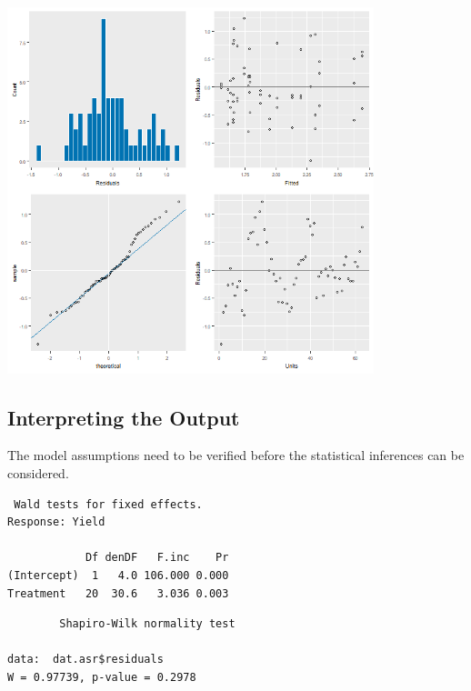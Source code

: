 \documentclass[a4paper, 10pt, fleqn, twosided]{memoir}
\begin{document}
\begin{tcolorbox}[title = Example 6 Output]
\includegraphics[width=0.8\textwidth, frame]{Example6Resplot.png}
\end{tcolorbox}


\subsection{Interpreting the Output}

The model assumptions need to be verified before the statistical inferences can be considered.

\begin{tcolorbox}[title = Example 6 Shapiro-Wilk normality test output]
\begin{verbatim}
 Wald tests for fixed effects.
Response: Yield

            Df denDF   F.inc    Pr
(Intercept)  1   4.0 106.000 0.000
Treatment   20  30.6   3.036 0.003

\end{verbatim}
\tcblower

\begin{verbatim}
        Shapiro-Wilk normality test

data:  dat.asr$residuals
W = 0.97739, p-value = 0.2978

\end{verbatim}
\end{tcolorbox}
\end{document}
